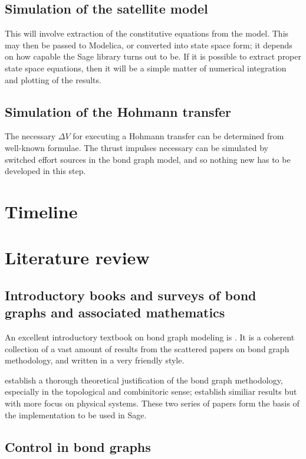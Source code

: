\documentclass[utf,a4paper,12pt]{report}
\begin{document}
\section{Simulation of the satellite model}
This will involve extraction of the constitutive equations from the model. This may then be passed to Modelica, or converted into state space form; it depends on how capable the Sage library turns out to be. If it is possible to extract proper state space equations, then it will be a simple matter of numerical integration and plotting of the results.

\section{Simulation of the Hohmann transfer}
The necessary $\Delta V$ for executing a Hohmann transfer can be determined from well-known formulae. The thrust impulses necessary can be simulated by switched effort sources in the bond graph model, and so nothing new has to be developed in this step.

\chapter{Timeline}

\chapter{Literature review}
\section{Introductory books and surveys of bond graphs and associated mathematics}
An excellent introductory textbook on bond graph modeling is \cite{Borutzky2010}. It is a coherent collection of a vast amount of results from the scattered papers on bond graph methodology, and written in a very friendly style.

\cite{Birkett1989,Birkett1989a,Birkett1990,Birkett1990a,Birkett2002,Birkett2002a} establish a thorough theoretical justification of the bond graph methodology, especially in the topological and combinitoric sense; \cite{Lamb1997b,Lamb1997,Lamb1997a} establish similiar results but with more focus on physical systems. These two series of papers form the basis of the implementation to be used in Sage.
\section{Control in bond graphs}
\end{document}
